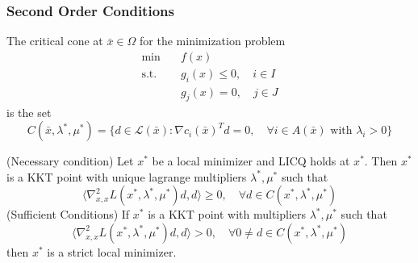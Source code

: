 \subsubsection{Second Order Conditions}
\begin{definition}
    The critical cone at $\bar x \in \Omega$ for the minimization problem 
    \begin{align*}
        \min \quad &f(x) \\
        \text{s.t.} \quad &g_i(x) \leq 0, \quad i \in I \\
        &g_j(x) = 0, \quad j \in J
    \end{align*}
    is the set $$C(\bar x, \lambda^*, \mu^*) = \{d \in \mathcal L(\bar x): \nabla c_i(\bar x)^T d = 0, \quad \forall i \in A(\bar x) \text{ with } \lambda_i > 0\}$$
\end{definition}
\begin{theorem}
    (Necessary condition) Let $x^*$ be a local minimizer and LICQ holds at $x^*$. Then $x^*$ is a KKT point with unique lagrange multipliers $\lambda^*, \mu^*$ such that $$\langle \nabla^2_{x, x} L(x^*, \lambda^*, \mu^*)d, d \rangle \geq 0, \quad \forall d \in C(x^*, \lambda^*, \mu^*)$$
    (Sufficient Conditions) If $x^*$ is a KKT point with multipliers $\lambda^*, \mu^*$ such that $$\langle \nabla^2_{x, x} L(x^*, \lambda^*, \mu^*)d, d \rangle > 0, \quad \forall 0 \neq d \in C(x^*, \lambda^*, \mu^*)$$ then $x^*$ is a strict local minimizer. 
\end{theorem}
